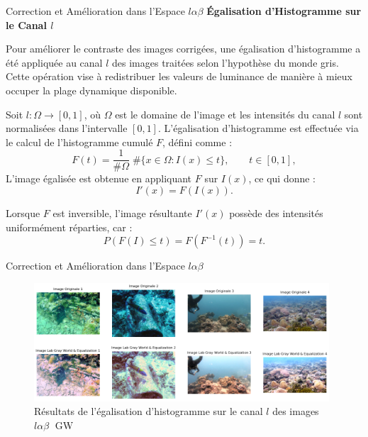 \documentclass[8pt,a4paper]{beamer}
\numberwithin{figure}{section}
\begin{document}
\begin{frame}{Correction et Amélioration dans l'Espace \( l\alpha\beta \)}
\textbf{Égalisation d'Histogramme sur le Canal \( l \)}
\vspace{3mm}  
\par Pour améliorer le contraste des images corrigées, une égalisation d'histogramme a été appliquée au canal \( l \) des images traitées selon l'hypothèse du monde gris. Cette opération vise à redistribuer les valeurs de luminance de manière à mieux occuper la plage dynamique disponible.
\vspace{2mm}
\par Soit \( l : \Omega \to [0, 1] \), où \( \Omega \) est le domaine de l'image et les intensités du canal $l$ sont normalisées dans l'intervalle \([0, 1]\). L'égalisation d'histogramme est effectuée via le calcul de l'histogramme cumulé \( F \), défini comme :
\[
F(t) = \frac{1}{\# \Omega} \; \# \{x \in \Omega : I(x) \leq t \}, \quad\quad t \in [0, 1],
\]
L'image égalisée est obtenue en appliquant \( F \) sur \( I(x) \), ce qui donne :
\[
I'(x) = F(I(x)).
\]

Lorsque \( F \) est inversible, l'image résultante \( I'(x) \) possède des intensités uniformément réparties, car :
\[
P(F(I) \leq t) = F(F^{-1}(t)) = t.
\]
\end{frame}

\begin{frame}{Correction et Amélioration dans l'Espace \( l\alpha\beta \)}
\begin{figure}[h!]
\begin{center}
\includegraphics[width=11cm]{image009.png}
\end{center}
\label{figure3.4}
\caption{Résultats de l'égalisation d'histogramme sur le canal $l$ des images $l\alpha\beta\;$ GW}
\end{figure} 
\end{frame}
\end{document}
